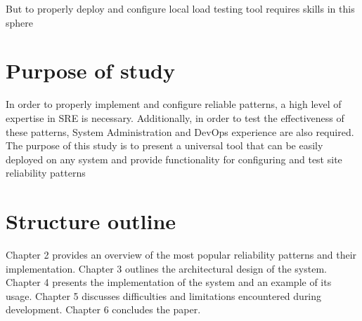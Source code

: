 But to properly deploy and configure local load testing tool requires skills in this sphere

\section{Purpose of study}\label{sec:purpose}
In order to properly implement and configure reliable patterns, a high level of expertise in SRE is necessary. Additionally, in order to test the effectiveness of these patterns, System Administration and DevOps experience are also required.
The purpose of this study is to present a universal tool that can be easily deployed on any system and provide functionality for configuring and test site reliability patterns

\section{Structure outline}\label{sec:structure-outline}
Chapter 2 provides an overview of the most popular reliability patterns and their implementation.
Chapter 3 outlines the architectural design of the system.
Chapter 4 presents the implementation of the system and an example of its usage.
Chapter 5 discusses difficulties and limitations encountered during development.
Chapter 6 concludes the paper.